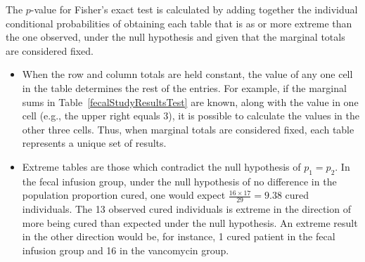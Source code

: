 The $p$-value for Fisher's exact test is calculated by adding together the individual conditional probabilities of obtaining each table that is as or more extreme than the one observed, under the null hypothesis and given that the marginal totals are considered fixed.

\begin{itemize}
	
	\item When the row and column totals are held constant, the value of any one cell in the table determines the rest of the entries. For example, if the marginal sums in Table~\ref{fecalStudyResultsTest} are known, along with the value in one cell (e.g., the upper right equals 3), it is possible to calculate the values in the other three cells. Thus, when marginal totals are considered fixed, each table represents a unique set of results.
	
	\item Extreme tables are those which contradict the null hypothesis of $p_1 = p_2$. In the fecal infusion group, under the null hypothesis of no difference in the population proportion cured, one would expect $\frac{16 \times 17}{29} = 9.38$ cured individuals. The 13 observed cured individuals is extreme in the direction of more being cured than expected under the null hypothesis. An extreme result in the other direction would be, for instance, 1 cured patient in the fecal infusion group and 16 in the vancomycin group.
	
\end{itemize}

